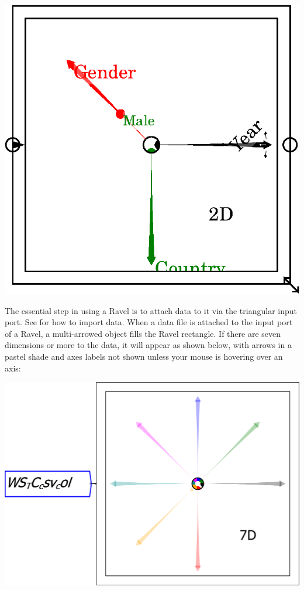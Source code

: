\includegraphics{images/RavelBlank}

The essential step in using a Ravel is to attach data to it via the
triangular input port. See 
for how to import data.  When a data file is attached to the input
port of a Ravel, a multi-arrowed object fills the Ravel rectangle. If
there are seven dimensions or more to the data, it will appear as
shown below, with arrows in a pastel shade and axes labels not shown
unless your mouse is hovering over an axis:

\begin{center}
\includegraphics[width=.7\textwidth]{images/RavelDataImporting01}
\end{center}

